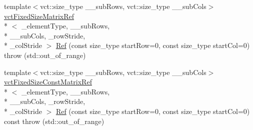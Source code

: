 \begin{DoxyCompactItemize}
\item 
{\footnotesize template$<$vct\-::size\-\_\-type \-\_\-\-\_\-sub\-Rows, vct\-::size\-\_\-type \-\_\-\-\_\-sub\-Cols$>$ }\\\hyperlink{classvct_fixed_size_matrix_ref}{vct\-Fixed\-Size\-Matrix\-Ref}\\*
$<$ \-\_\-element\-Type, \-\_\-\-\_\-sub\-Rows, \\*
\-\_\-\-\_\-sub\-Cols, \-\_\-row\-Stride, \\*
\-\_\-col\-Stride $>$ \hyperlink{classvct_fixed_size_matrix_base_acf729244341ca620141b0669fef5c598}{Ref} (const size\-\_\-type start\-Row=0, const size\-\_\-type start\-Col=0)  throw (std\-::out\-\_\-of\-\_\-range)
\item 
{\footnotesize template$<$vct\-::size\-\_\-type \-\_\-\-\_\-sub\-Rows, vct\-::size\-\_\-type \-\_\-\-\_\-sub\-Cols$>$ }\\\hyperlink{classvct_fixed_size_const_matrix_ref}{vct\-Fixed\-Size\-Const\-Matrix\-Ref}\\*
$<$ \-\_\-element\-Type, \-\_\-\-\_\-sub\-Rows, \\*
\-\_\-\-\_\-sub\-Cols, \-\_\-row\-Stride, \\*
\-\_\-col\-Stride $>$ \hyperlink{classvct_fixed_size_matrix_base_af2e0c3a89e8176184167b94d51d7c007}{Ref} (const size\-\_\-type start\-Row=0, const size\-\_\-type start\-Col=0) const   throw (std\-::out\-\_\-of\-\_\-range)
\end{DoxyCompactItemize}

